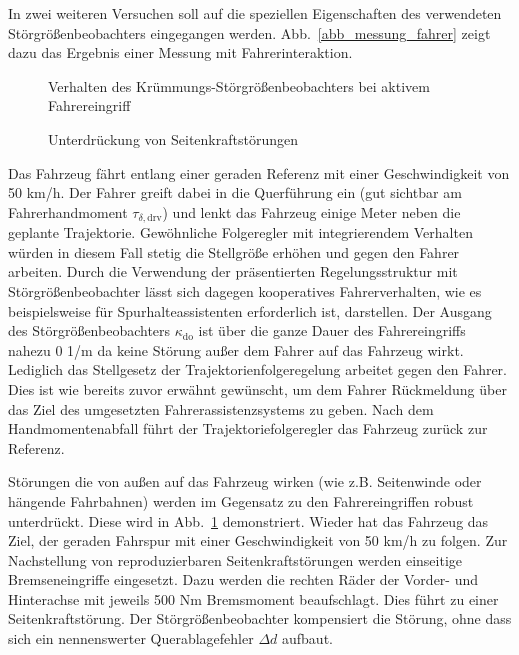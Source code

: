 In zwei weiteren Versuchen soll auf die speziellen Eigenschaften des verwendeten Störgrößenbeobachters eingegangen werden.  Abb.~\ref{abb_messung_fahrer} zeigt dazu das Ergebnis einer Messung mit Fahrerinteraktion.  
\begin{figure}[thpb]
	 \centering 
		\begin{minipage}[t]{0.45\linewidth} 
			\centering
			\setlength\figureheight{6cm} 
			\setlength\figurewidth{4cm}
			
			\caption{Verhalten des Krümmungs-Störgrößenbeobachters bei aktivem Fahrereingriff}
			\label{abb_messung_fahrer}
		\end{minipage}
	 \hfill
		 \begin{minipage}[t]{0.45\linewidth} 
			\centering
			\setlength\figureheight{6cm} 
			\setlength\figurewidth{4cm}
				
			\caption{Unterdrückung von Seitenkraftstörungen}
			\label{abb_stoerunterdrueckung_sgs}
		\end{minipage}
\end{figure}
Das Fahrzeug fährt entlang einer geraden Referenz mit einer Geschwindigkeit von 50 km/h. Der Fahrer greift dabei in die Querführung ein (gut sichtbar am Fahrerhandmoment $\tau_{\delta,\mathrm{drv}}$) und lenkt das Fahrzeug einige Meter neben die geplante Trajektorie.  Gewöhnliche Folgeregler mit integrierendem Verhalten würden in diesem Fall stetig die Stellgröße erhöhen und gegen den Fahrer arbeiten.  Durch die Verwendung der präsentierten Regelungsstruktur mit Störgrößenbeobachter lässt sich dagegen kooperatives Fahrerverhalten, wie es beispielsweise für Spurhalteassistenten erforderlich ist, darstellen.  Der Ausgang des Störgrößenbeobachters $\kappa_\mathrm{do}$ ist über die ganze Dauer des Fahrereingriffs nahezu 0 1/m da keine Störung außer dem Fahrer auf das Fahrzeug wirkt.  Lediglich das Stellgesetz der Trajektorienfolgeregelung arbeitet gegen den Fahrer. Dies ist wie bereits zuvor erwähnt gewünscht, um dem Fahrer Rückmeldung über das Ziel des umgesetzten Fahrerassistenzsystems zu geben. Nach dem Handmomentenabfall führt der Trajektoriefolgeregler das Fahrzeug zurück zur Referenz.  

Störungen die von außen auf das Fahrzeug wirken (wie z.B. Seitenwinde oder hängende Fahrbahnen) werden im Gegensatz zu den Fahrereingriffen robust unterdrückt. Diese wird in
Abb.~\ref{abb_stoerunterdrueckung_sgs} demonstriert.  Wieder hat das Fahrzeug das Ziel, der geraden Fahrspur mit einer Geschwindigkeit von 50 km/h zu folgen. Zur Nachstellung von reproduzierbaren Seitenkraftstörungen werden einseitige Bremseneingriffe eingesetzt. Dazu werden die rechten Räder der Vorder- und Hinterachse mit jeweils 500 Nm Bremsmoment beaufschlagt. Dies führt zu einer Seitenkraftstörung. Der Störgrößenbeobachter kompensiert die Störung, ohne dass sich ein nennenswerter Querablagefehler $\Delta d$ aufbaut.

\FloatBarrier
